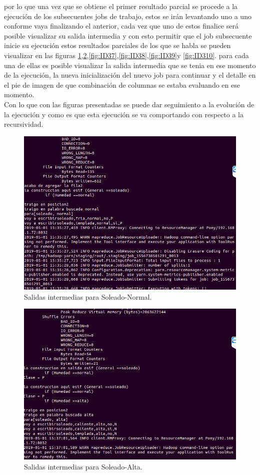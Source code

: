 por lo que una vez que se obtiene el primer resultado parcial se procede a la ejecución de los subsecuentes jobs de trabajo, estos se irán levantando uno a uno conforme vaya finalizando el anterior, cada vez que uno de estos finalice será posible visualizar su salida intermedia y con esto permitir que el job subsecuente inicie su ejecución estos resultados parciales de los que se habla se pueden visualizar en las figuras \ref{fig:ID35},\ref{fig:ID36},\ref{fig:ID37},\ref{fig:ID38},\ref{fig:ID39}y \ref{fig:ID310}. para cada una de ellas es posible visualizar la salida intermedia que se tenia en ese momento de la ejecución, la nueva inicialización del nuevo job para continuar y el detalle en el pie de imagen de que combinación de columnas se estaba evaluando en ese momento. \\
Con lo que con las figuras presentadas se puede dar seguimiento a la evolución de la ejecución y como es que esta ejecución se va comportando con respecto a la recursividad. 
\begin{figure}[H]
	\begin{center}
		\hypertarget{fig:ID35}{\hspace{1pt}}
		\includegraphics[width=.7\textwidth]{capitulo4a/images/ID3_6.png}
		\caption{Salidas intermedias para Soleado-Normal.}
		\label{fig:ID35}
	\end{center}
\end{figure}
\begin{figure}[H]
	\begin{center}
		\hypertarget{fig:ID36}{\hspace{1pt}}
		\includegraphics[width=.7\textwidth]{capitulo4a/images/ID3_8.png}
		\caption{Salidas intermedias para Soleado-Alta.}
		\label{fig:ID36}
	\end{center}
\end{figure}
